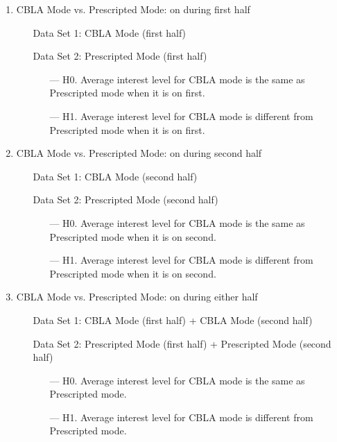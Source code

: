 \begin{enumerate}
	\item CBLA Mode vs. Prescripted Mode: on during first half
		\begin{itemize}[align=left]
			\item[Data Set 1: ] CBLA Mode (first half)
			\item[Data Set 2: ]  Prescripted Mode (first half)
			\begin{itemize}
				\item[--- H0.] Average interest level for CBLA mode is the same as Prescripted mode when it is on first.
				\item[--- H1.] Average interest level for CBLA mode is different from Prescripted mode when it is on first.
			\end{itemize}
		\end{itemize}
	\item CBLA Mode vs. Prescripted Mode: on during second half\label{itm:w-ttest-cbla-2nd}		\begin{itemize}[align=left]
			\item[Data Set 1: ] CBLA Mode (second half)
			\item[Data Set 2: ] Prescripted Mode (second half)
			\begin{itemize}
				\item[--- H0.] Average interest level for CBLA mode is the same as Prescripted mode when it is on second.
				\item[--- H1.] Average interest level for CBLA mode is different from Prescripted mode when it is on second.
			\end{itemize}
		\end{itemize}
	\item CBLA Mode vs. Prescripted Mode: on during either half \label{itm:interest-wtest-last}
		\begin{itemize}[align=left]
			\item[Data Set 1: ] CBLA Mode (first half) + CBLA Mode (second half)
			\item[Data Set 2: ] Prescripted Mode (first half) + Prescripted Mode (second half)
			\begin{itemize}
				\item[--- H0.] Average interest level for CBLA mode is the same as Prescripted mode.
				\item[--- H1.] Average interest level for CBLA mode is different from Prescripted mode.
			\end{itemize}
		\end{itemize}
\end{enumerate}


